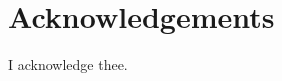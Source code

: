 \newpage
\thispagestyle{empty}
\null
\newpage

\clearpage
\thispagestyle{empty}


\chapter*{Acknowledgements}
I acknowledge thee. %
\clearpage
